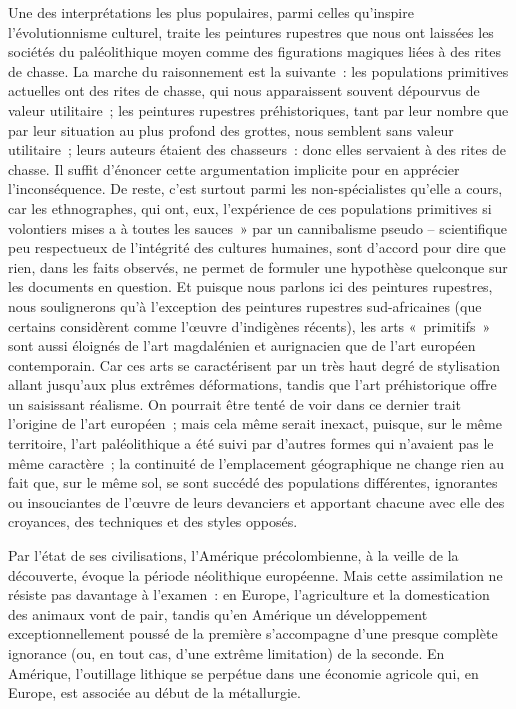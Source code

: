 \documentclass[french,twoside]{book} %
\begin{document}
Une des interprétations les plus populaires, parmi celles qu’inspire l’évolutionnisme culturel, traite les peintures rupestres que nous ont laissées les sociétés du paléolithique moyen comme des figurations magiques liées à des rites de chasse. La marche du raisonnement est la suivante : les populations primitives actuelles ont des rites de chasse, qui nous apparaissent souvent dépourvus de valeur utilitaire ; les peintures rupestres préhistoriques, tant par leur nombre que par leur situation au plus profond des grottes, nous semblent sans valeur utilitaire ; leurs auteurs étaient des chasseurs : donc elles servaient à des rites de chasse. Il suffit d’énoncer cette argumentation implicite pour en apprécier l’inconséquence. De reste, c’est surtout parmi les non-spécialistes qu’elle a cours, car les ethnographes, qui ont, eux, l’expérience de ces populations primitives si volontiers mises a à toutes les sauces » par un cannibalisme pseudo – scientifique peu respectueux de l’intégrité des cultures humaines, sont d’accord pour dire que rien, dans les faits observés, ne permet de formuler une hypothèse quelconque sur les documents en question. Et puisque nous parlons ici des peintures rupestres, nous soulignerons qu’à l’exception des peintures rupestres sud-africaines (que certains considèrent comme l’œuvre d’indigènes récents), les arts « primitifs » sont aussi éloignés de l’art magdalénien et aurignacien que de l’art européen contemporain. Car ces arts se caractérisent par un très haut degré de stylisation allant jusqu’aux plus extrêmes déformations, tandis que l’art préhistorique offre un saisissant réalisme. On pourrait être tenté de voir dans ce dernier trait l’origine de l’art européen ; mais cela même serait inexact, puisque, sur le même territoire, l’art paléolithique a été suivi par d’autres formes qui n’avaient pas le même caractère ; la continuité de l’emplacement géographique ne change rien au fait que, sur le même sol, se sont succédé des populations différentes, ignorantes ou insouciantes de l’œuvre de leurs devanciers et apportant chacune avec elle des croyances, des techniques et des styles opposés.\par
Par l’état de ses civilisations, l’Amérique précolombienne, à la veille de la découverte, évoque la période néolithique européenne. Mais cette assimilation ne résiste pas davantage à l’examen : en Europe, l’agriculture et la domestication des animaux vont de pair, tandis qu’en Amérique un développement exceptionnellement poussé de la première s’accompagne d’une presque complète ignorance (ou, en tout cas, d’une extrême limitation) de la seconde. En Amérique, l’outillage lithique se perpétue dans une économie agricole qui, en Europe, est associée au début de la métallurgie.\par
\end{document}
